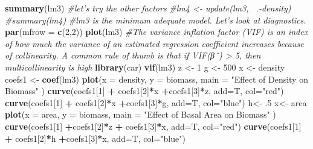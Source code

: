 \documentclass[]{article}
\newenvironment{Shaded}{\begin{snugshade}}{\end{snugshade}}
\newcommand{\KeywordTok}[1]{\textcolor[rgb]{0.13,0.29,0.53}{\textbf{#1}}}
\newcommand{\DataTypeTok}[1]{\textcolor[rgb]{0.13,0.29,0.53}{#1}}
\newcommand{\DecValTok}[1]{\textcolor[rgb]{0.00,0.00,0.81}{#1}}
\newcommand{\StringTok}[1]{\textcolor[rgb]{0.31,0.60,0.02}{#1}}
\newcommand{\CommentTok}[1]{\textcolor[rgb]{0.56,0.35,0.01}{\textit{#1}}}
\newcommand{\OperatorTok}[1]{\textcolor[rgb]{0.81,0.36,0.00}{\textbf{#1}}}
\newcommand{\NormalTok}[1]{#1}
\begin{document}
\begin{Shaded}
\begin{Highlighting}[]
 \KeywordTok{summary}\NormalTok{(lm3)}
 \CommentTok{#let's try the other factors}
 \CommentTok{#lm4 <- update(lm3, ~.-density)}
 \CommentTok{#summary(lm4)}
 \CommentTok{#lm3 is the minimum adequate model. Let's look at diagnostics. }
  \KeywordTok{par}\NormalTok{(}\DataTypeTok{mfrow =} \KeywordTok{c}\NormalTok{(}\DecValTok{2}\NormalTok{,}\DecValTok{2}\NormalTok{)) }
  \KeywordTok{plot}\NormalTok{(lm3)}
 \CommentTok{#The variance inflation factor (VIF) is an index of how much the variance of an estimated regression coefficient increases because of collinearity. A common rule of thumb is that if VIF(βˆ) > 5, then multicollinearity is high}
\KeywordTok{library}\NormalTok{(car)}
\KeywordTok{vif}\NormalTok{(lm3)}
\NormalTok{z <-}\StringTok{ }\DecValTok{1}
\NormalTok{g <-}\StringTok{ }\DecValTok{500}
\NormalTok{x <-}\StringTok{ }\NormalTok{density}
\NormalTok{coefs1 <-}\StringTok{ }\KeywordTok{coef}\NormalTok{(lm3)}
\KeywordTok{plot}\NormalTok{(}\DataTypeTok{x =}\NormalTok{ density, }\DataTypeTok{y =}\NormalTok{ biomass, }\DataTypeTok{main =} \StringTok{"Effect of Density on Biomass"}\NormalTok{ )}
\KeywordTok{curve}\NormalTok{(coefs1[}\DecValTok{1}\NormalTok{] }\OperatorTok{+}\StringTok{ }\NormalTok{coefs1[}\DecValTok{2}\NormalTok{]}\OperatorTok{*}\NormalTok{x }\OperatorTok{+}\NormalTok{coefs1[}\DecValTok{3}\NormalTok{]}\OperatorTok{*}\NormalTok{z, }\DataTypeTok{add=}\NormalTok{T, }\DataTypeTok{col=}\StringTok{"red"}\NormalTok{) }
\KeywordTok{curve}\NormalTok{(coefs1[}\DecValTok{1}\NormalTok{] }\OperatorTok{+}\StringTok{ }\NormalTok{coefs1[}\DecValTok{2}\NormalTok{]}\OperatorTok{*}\NormalTok{x }\OperatorTok{+}\NormalTok{coefs1[}\DecValTok{3}\NormalTok{]}\OperatorTok{*}\NormalTok{g, }\DataTypeTok{add=}\NormalTok{T, }\DataTypeTok{col=}\StringTok{"blue"}\NormalTok{)}
\NormalTok{h<-}\StringTok{ }\NormalTok{.}\DecValTok{5}
\NormalTok{x<-}\StringTok{ }\NormalTok{area}
\KeywordTok{plot}\NormalTok{(}\DataTypeTok{x =}\NormalTok{ area, }\DataTypeTok{y =}\NormalTok{ biomass, }\DataTypeTok{main =} \StringTok{"Effect of Basal Area on Biomass"}\NormalTok{ )}
\KeywordTok{curve}\NormalTok{(coefs1[}\DecValTok{1}\NormalTok{] }\OperatorTok{+}\NormalTok{coefs1[}\DecValTok{2}\NormalTok{]}\OperatorTok{*}\NormalTok{z }\OperatorTok{+}\StringTok{ }\NormalTok{coefs1[}\DecValTok{3}\NormalTok{]}\OperatorTok{*}\NormalTok{x, }\DataTypeTok{add=}\NormalTok{T, }\DataTypeTok{col=}\StringTok{"red"}\NormalTok{)}
\KeywordTok{curve}\NormalTok{(coefs1[}\DecValTok{1}\NormalTok{] }\OperatorTok{+}\StringTok{ }\NormalTok{coefs1[}\DecValTok{2}\NormalTok{]}\OperatorTok{*}\NormalTok{h }\OperatorTok{+}\NormalTok{coefs1[}\DecValTok{3}\NormalTok{]}\OperatorTok{*}\NormalTok{x, }\DataTypeTok{add=}\NormalTok{T, }\DataTypeTok{col=}\StringTok{"blue"}\NormalTok{)}

\end{Highlighting}
\end{Shaded}
\end{document}
